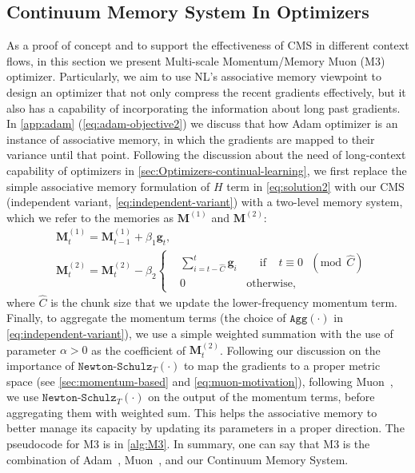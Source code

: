 \documentclass{article}
\newcommand{\citep}{\parencite}
\newcommand{\vg}{\boldsymbol{g}}
\begin{document}
{\subsection{Continuum Memory System In Optimizers}
As a proof of concept and to support the effectiveness of CMS in different context flows, in this section we present Multi-scale Momentum/Memory Muon (M3) optimizer. Particularly, we aim to use NL's associative memory viewpoint to design an optimizer that not only compress the recent gradients effectively, but it also has a capability of incorporating the information about long past gradients. In \autoref{app:adam} (\autoref{eq:adam-objective2}) we discuss that how Adam optimizer is an instance of associative memory, in which the gradients are mapped to their variance until that point. Following the discussion about the need of long-context capability of optimizers in \autoref{sec:Optimizers-continual-learning}, we first replace the simple associative memory formulation of ${H}$ term in \autoref{eq:solution2} with our CMS (independent variant, \autoref{eq:independent-variant}) with a two-level memory system, which we refer to the memories as $\boldsymbol{M}^{(1)}$ and $\boldsymbol{M}^{(2)}$:
\begin{align}\nonumber
    &\boldsymbol{M}^{(1)}_{t} = \boldsymbol{M}^{(1)}_{t-1} + \beta_1 \vg_t,   \\ 
    &\boldsymbol{M}^{(2)}_{t} = \boldsymbol{M}^{(2)}_{t} - \beta_2 \begin{cases}
        &\sum_{i = t-\hat{C}}^{t}  \vg_i  \quad \quad \text{if} \:\:\:\:\:t \equiv 0 \:\:\: (\text{mod} \:\: \hat{C})\\
        &0 \qquad \quad \:\:\qquad \text{otherwise,}
    \end{cases}
\end{align}
where $\hat{C}$ is the chunk size that we update the lower-frequency momentum term. Finally, to aggregate the momentum terms (the choice of $\texttt{Agg}(\cdot)$ in \autoref{eq:independent-variant}), we use a simple weighted summation with the use of parameter $\alpha > 0$ as the coefficient of $\boldsymbol{M}^{(2)}_{t}$. Following our discussion on the importance of $\texttt{Newton-Schulz}_T(\cdot)$ to map the gradients to a proper metric space (see \autoref{sec:momentum-based} and \autoref{eq:muon-motivation}), following Muon~\citep{jordanmuon}, we use $\texttt{Newton-Schulz}_T(\cdot)$ on the output of the momentum terms, before aggregating them with weighted sum. This helps the associative memory to better manage its capacity by updating its parameters in a proper direction. The pseudocode for M3 is in \autoref{alg:M3}. In summary, one can say that M3 is the combination of Adam~\citep{kingma2014adam}, Muon~\citep{jordanmuon}, and our Continuum Memory System.

}
\end{document}
